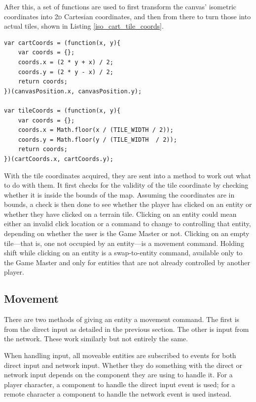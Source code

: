 After this, a set of functions are used to first transform the canvas' isometric coordinates into \textsc{2d} Cartesian coordinates, and then from there to turn those into actual tiles, shown in Listing \ref{iso_cart_tile_coords}.

\noindent
\begin{minipage}{\linewidth}
\begin{lstlisting}[style=js, caption={Turning the canvas isometric coordinates into \textsc{2d} Cartesian coordinates and then into tile positions. Original algorithm to transform isometric to Cartesian space from \cite{citeulike:13155325}.}, label=iso_cart_tile_coords]
var cartCoords = (function(x, y){
    var coords = {};
    coords.x = (2 * y + x) / 2;
    coords.y = (2 * y - x) / 2;
    return coords;
})(canvasPosition.x, canvasPosition.y);

var tileCoords = (function(x, y){
    var coords = {};
    coords.x = Math.floor(x / (TILE_WIDTH / 2));
    coords.y = Math.floor(y / (TILE_WIDTH  / 2));
    return coords;
})(cartCoords.x, cartCoords.y);
\end{lstlisting}
\end{minipage}

With the tile coordinates acquired, they are sent into a method to work out what to do with them. It first checks for the validity of the tile coordinate by checking whether it is inside the bounds of the map. Assuming the coordinates are in bounds, a check is then done to see whether the player has clicked on an entity or whether they have clicked on a terrain tile. Clicking on an entity could mean either an invalid click location or a command to change to controlling that entity, depending on whether the user is the Game Master or not. Clicking on an empty tile---that is, one not occupied by an entity---is a movement command. Holding shift while clicking on an entity is a swap-to-entity command, available only to the Game Master and only for entities that are not already controlled by another player.

\subsection{Movement}
There are two methods of giving an entity a movement command. The first is from the direct input as detailed in the previous section. The other is input from the network. These work similarly but not entirely the same.

When handling input, all moveable entities are subscribed to events for both direct input and network input. Whether they do something with the direct or network input depends on the component they are using to handle it. For a player character, a component to handle the direct input event is used; for a remote character a component to handle the network event is used instead.

